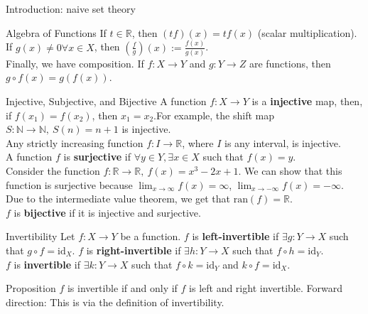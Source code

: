\documentclass[10pt]{extarticle}
\begin{document}
\begin{problem}{Introduction: naive set theory}
\begin{problem}{Algebra of Functions}
      If $t\in \mathbb{R}$, then $(tf)(x) = tf(x)$ (scalar multiplication). If $g(x)\neq 0\forall x\in X$, then $\left(\frac{f}{g}\right)(x) := \frac{f(x)}{g(x)}$.\\

      Finally, we have composition. If $f:X\rightarrow Y$ and $g:Y\rightarrow Z$ are functions, then $g\circ f(x) = g(f(x))$.
    \end{problem}
    \begin{problem}{Injective, Subjective, and Bijective}
      A function $f:X\rightarrow Y$ is a \textbf{injective} map, then, if $f(x_1) = f(x_2)$, then $x_1 = x_2$.For example, the shift map $S:\mathbb{N} \rightarrow \mathbb{N},~S(n) = n+1$ is injective.\\

      Any strictly increasing function $f:I\rightarrow \mathbb{R}$, where $I$ is any interval, is injective.\\

      A function $f$ is \textbf{surjective} if $\forall y\in Y, \exists x\in X$ such that $f(x) = y$.\\

      Consider the function $f:\mathbb{R} \rightarrow \mathbb{R},~f(x) = x^3-2x+1$. We can show that this function is surjective because $\lim_{x\rightarrow \infty}f(x) = \infty$, $\lim_{x\rightarrow -\infty} f(x) = -\infty$. Due to the intermediate value theorem, we get that $\textrm{ran}(f) = \mathbb{R}$.\\

      $f$ is \textbf{bijective} if it is injective and surjective.
    \end{problem}
    \begin{problem}{Invertibility}
      Let $f:X\rightarrow Y$ be a function. $f$ is \textbf{left-invertible} if $\exists g:Y\rightarrow X$ such that $g\circ f = \textrm{id}_X$. $f$ is \textbf{right-invertible} if $\exists h:Y\rightarrow X$ such that $f\circ h = \textrm{id}_Y$.\\

      $f$ is \textbf{invertible} if $\exists k:Y\rightarrow X$ such that $f\circ k = \textrm{id}_Y$ and $k\circ f = \textrm{id}_X$.\\

      \begin{problem}{Proposition}
        $f$ is invertible if and only if $f$ is left and right invertible.
        \tcblower
          Forward direction: This is via the definition of invertibility.\\


\end{problem}
\end{problem}
\end{problem}
\end{document}
